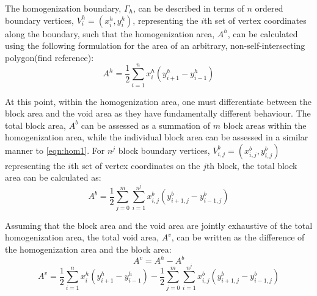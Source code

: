 The homogenization boundary, $\Gamma_{h}$, can be described in terms of $n$ ordered boundary vertices, $V_{i}^{h} = (x_{i}^{h}, y_{i}^{h})$, representing the $i$th set of vertex coordinates along the boundary, such that the homogenization area, $A^h$, can be calculated using the following formulation for the area of an arbitrary, non-self-intersecting polygon(find reference):
\begin{equation}
\label{eqn:hom1}
A^h = \dfrac{1}{2} \sum_{i=1}^{n}x_i^h(y_{i+1}^h-y_{i-1}^h)
\end{equation}

At this point, within the homogenization area, one must differentiate between the block area and the void area as they have fundamentally different behaviour. The total block area, $A^b$ can be assessed as a summation of $m$ block areas within the homogenization area, while the individual block area can be assessed in a similar manner to \ref{eqn:hom1}. For $n^j$ block boundary vertices, $V_{i,j}^{b} = (x_{i,j}^{b}, y_{i,j}^{b})$ representing the $i$th set of vertex coordinates on the $j$th block, the total block area can be calculated as:
\begin{equation}
\label{eqn:hom2}
A^b = \dfrac{1}{2} \sum_{j=0}^{m} \sum_{i=1}^{n^j} x_{i,j}^b(y_{i+1,j}^b-y_{i-1,j}^b)
\end{equation}

Assuming that the block area and the void area are jointly exhaustive of the total homogenization area, the total void area, $A^v$, can be written as the difference of the homogenization area and the block area:
\begin{equation}
\label{eqn:hom3}
A^v = A^h - A^b
\end{equation}
\begin{equation}
\label{eqn:hom4}
A^v = \dfrac{1}{2} \sum_{i=1}^{n}x_i^h(y_{i+1}^h-y_{i-1}^h) - \dfrac{1}{2} \sum_{j=0}^{m} \sum_{i=1}^{n^j} x_{i,j}^b(y_{i+1,j}^b-y_{i-1,j}^b)
\end{equation}


